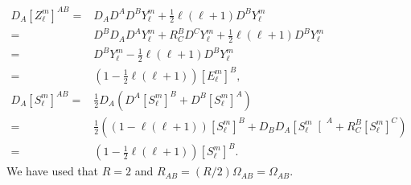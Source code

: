 \documentclass[12pt]{report}
\begin{document}
\begin{align}
    D_A\left[Z^m_{\ell}\right]^{AB}
    =&
    D_AD^AD^BY^m_{\ell}
    +
    \frac{1}{2}\ell\left(\ell+1\right)D^BY^m_{\ell}
    \nonumber\\
    =&
    D^BD_AD^AY^m_{\ell}
    +
    R^B_CD^CY^m_{\ell}
    +
    \frac{1}{2}\ell\left(\ell+1\right)D^BY^m_{\ell}
    \nonumber\\
    =&
    D^BY^m_{\ell}
    -
    \frac{1}{2}\ell\left(\ell+1\right)D^BY^m_{\ell}
    \nonumber\\
    =&
    \left(
        1
        -
        \frac{1}{2}\ell\left(\ell+1\right)
    \right)
    \left[E^m_{\ell}\right]^B
    ,\\
    D_A\left[S^m_{\ell}\right]^{AB}
    =&
    \frac{1}{2}D_A\left(
        D^A\left[S^m_{\ell}\right]^B
        +
        D^B\left[S^m_{\ell}\right]^A
    \right)
    \nonumber\\
    =&
    \frac{1}{2}\left(
        \left(1-\ell\left(\ell+1\right)\right)\left[S^m_{\ell}\right]^B
        +
        D_BD_A\left[S^m_{\ell}\right[^A
        +
        R^B_C\left[S^m_{\ell}\right]^C
    \right)
    \nonumber\\
    =&
    \left(
        1
        -
        \frac{1}{2}\ell\left(\ell+1\right)
    \right)
    \left[S^m_{\ell}\right]^B
    .
\end{align}
We have used that $R=2$ and $R_{AB} = (R/2)\Omega_{AB}=\Omega_{AB}$.



\end{document}

